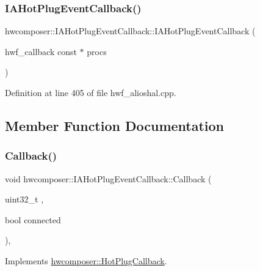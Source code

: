 \subsubsection{\texorpdfstring{I\+A\+Hot\+Plug\+Event\+Callback()}{IAHotPlugEventCallback()}}
{\footnotesize\ttfamily hwcomposer\+::\+I\+A\+Hot\+Plug\+Event\+Callback\+::\+I\+A\+Hot\+Plug\+Event\+Callback (\begin{DoxyParamCaption}\item[{hwf\+\_\+callback const $\ast$}]{procs }\end{DoxyParamCaption})\hspace{0.3cm}{\ttfamily [inline]}}



Definition at line 405 of file hwf\+\_\+alioshal.\+cpp.


\begin{DoxyCode}{0}
\end{DoxyCode}


\subsection{Member Function Documentation}
\mbox{\label{classhwcomposer_1_1IAHotPlugEventCallback_a77b86b9fb88073abf1cab0b5aed4be1d}} 
\subsubsection{\texorpdfstring{Callback()}{Callback()}}
{\footnotesize\ttfamily void hwcomposer\+::\+I\+A\+Hot\+Plug\+Event\+Callback\+::\+Callback (\begin{DoxyParamCaption}\item[{uint32\+\_\+t}]{,  }\item[{bool}]{connected }\end{DoxyParamCaption})\hspace{0.3cm}{\ttfamily [inline]}, {\ttfamily [virtual]}}



Implements \mbox{\hyperlink{classhwcomposer_1_1HotPlugCallback_a455c8913e1da9b165134a05c9cb441ba}{hwcomposer\+::\+Hot\+Plug\+Callback}}.



